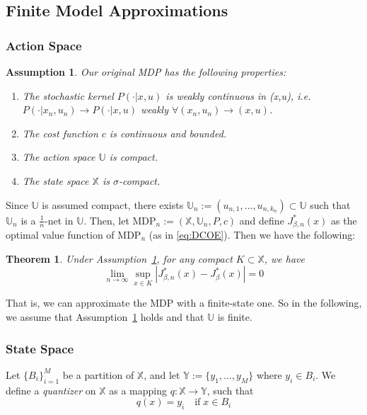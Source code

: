 \documentclass{article}
\newtheorem{theorem}{Theorem}[section]
\newtheorem{assumption}{Assumption}[section]
\begin{document}
\subsection{Finite Model Approximations}

\subsubsection*{Action Space}
\begin{assumption}\label{assumption:MDP} Our original MDP has the following properties:
    \begin{enumerate}
        \item The stochastic kernel \(P(\cdot | x,u)\) is weakly continuous in (x,u), i.e. \(P(\cdot | x_n,u_n) \to P(\cdot | x,u)\) weakly \(\forall (x_n,u_n) \to (x,u)\).
        \item The cost function \(c\) is continuous and bounded.
        \item The action space \(\mathbb{U}\) is compact.
        \item The state space \(\mathbb{X}\) is \(\sigma\)-compact.
    \end{enumerate}
\end{assumption}

Since \(\mathbb{U}\) is assumed compact, there exists \(\mathbb{U}_n := (u_{n,1},\ldots,u_{n,k_n}) \subset \mathbb{U}\) such that \(\mathbb{U}_n\) is a \(\frac{1}{n}\)-net in \(\mathbb{U}\). Then, let \(\text{MDP}_n := (\mathbb{X}, \mathbb{U}_n, P, c)\) and define \(J^*_{\beta,n}(x)\) as the optimal value function of \(\text{MDP}_n\) (as in \eqref{eq:DCOE}). Then we have the following:
\begin{theorem}\cite[Theorem 3.16]{Quantized_Models}
    Under Assumption~\ref{assumption:MDP}, for any compact \(K \subset \mathbb{X}\), we have
    \[ \lim_{n \to \infty}\sup_{x \in K}|J^*_{\beta,n}(x) - J^*_\beta(x)| = 0 \]
\end{theorem}

That is, we can approximate the MDP with a finite-state one. So in the following, we assume that Assumption~\ref{assumption:MDP} holds and that \(\mathbb{U}\) is finite.

\subsubsection*{State Space}
Let \(\{B_i\}_{i=1}^M\) be a partition of \(\mathbb{X}\), and let \(\mathbb{Y} := \{y_1,\ldots,y_M\}\) where \(y_i \in B_i\). We define a \emph{quantizer} on \(\mathbb{X}\) as a mapping \(q : \mathbb{X} \to \mathbb{Y}\), such that
\[ q(x) = y_i \quad \text{if} \; x \in B_i \]
\end{document}
